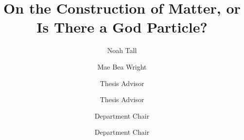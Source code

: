 \documentclass{scu-thesis}
\author{Noah Tall}
\author{Mae Bea Wright}
\title{On the Construction of Matter, or Is There a God Particle?}
\begin{document}
\frontmatter
\signature{Thesis Advisor}
\signature{Thesis Advisor}
\signature{Department Chair}
\signature{Department Chair}

\maketitle

\acknowledgementpage   %

\tableofcontents
\listoffigures

\mainmatter








\backmatter


\end{document}
